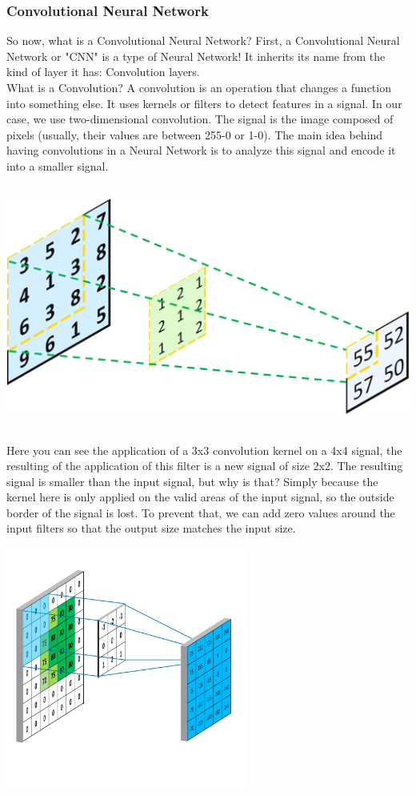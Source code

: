 \documentclass[12pt]{article}
\begin{document}
\newpage

\subsubsection{Convolutional Neural Network}
So now, what is a Convolutional Neural Network?
First, a Convolutional Neural Network or "CNN" is a type of Neural Network! It inherits its name from the kind of layer it has: Convolution layers. \\

What is a Convolution? 
A convolution is an operation that changes a function into something else. It uses kernels or filters to detect features in a signal. In our case, we use two-dimensional convolution. The signal is the image composed of pixels (usually, their values are between 255-0 or 1-0). The main idea behind having convolutions in a Neural Network is to analyze this signal and encode it into a smaller signal. \\
\centerline{\includegraphics[height=8cm]{../../docs/convolution.png}}

Here you can see the application of a 3x3 convolution kernel on a 4x4 signal, the resulting of the application of this filter is a new signal of size 2x2. The resulting signal is smaller than the input signal, but why is that? Simply because the kernel here is only applied on the valid areas of the input signal, so the outside border of the signal is lost. To prevent that, we can add zero values around the input filters so that the output size matches the input size. \\
\centerline{\includegraphics[height=8cm]{../../docs/padding.png}}
\end{document}
